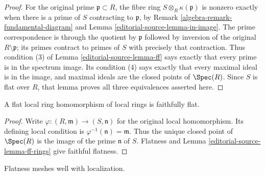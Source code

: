\begin{proof}
For the original prime $\mathfrak p\subset R$, the fibre
ring $S\otimes_R\kappa(\mathfrak p)$ is nonzero exactly
when there is a prime of $S$ contracting to $\mathfrak p$,
by Remark \ref{algebra-remark-fundamental-diagram} and
Lemma \ref{editorial-source-lemma-in-image}. The prime correspondence is
through the quotient by $\mathfrak p$ followed by inversion
of the original $R\setminus\mathfrak p$; its primes
contract to primes of $S$ with precisely that contraction.
Thus condition (3) of Lemma \ref{editorial-source-lemma-ff} says exactly
that every prime is in the spectrum image. Its condition
(4) says exactly that every maximal ideal is in the image,
and maximal ideals are the closed points of $\Spec(R)$.
Since $S$ is flat over $R$, that lemma proves all three
equivalences asserted here.
\end{proof}

\begin{lemma}
\label{editorial-source-lemma-local-flat-ff}
A flat local ring homomorphism of local rings is faithfully flat.
\end{lemma}

\begin{proof}
Write $\varphi:(R,\mathfrak m)\to(S,\mathfrak n)$ for
the original local homomorphism. Its defining local
condition is $\varphi^{-1}(\mathfrak n)=\mathfrak m$.
Thus the unique closed point of $\Spec(R)$ is the image
of the prime $\mathfrak n$ of $S$. Flatness and
Lemma \ref{editorial-source-lemma-ff-rings} give faithful flatness.
\end{proof}

\noindent
Flatness meshes well with localization.

